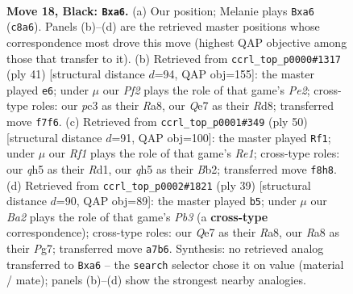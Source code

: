 \documentclass[11pt]{article}
\begin{document}
\clearpage

\begin{figure}[p]\centering
\begin{subfigure}{0.46\textwidth}\centering
\resizebox{\linewidth}{!}{%
\newchessgame
\chessboard[
  setfen={r1b2r2/b1p1qp1k/P1p4p/4p1pQ/4P1P1/2PP4/5P2/RNB2RK1 b - - 0 18},
  showmover=false,
  pgfstyle=straightmove, color=movearrow, markmove={c8-a6}
]}
\caption{}
\end{subfigure}\hfill
\begin{subfigure}{0.46\textwidth}\centering
\resizebox{\linewidth}{!}{%
\newchessgame
\chessboard[
  setfen={r2r2k1/2q1pp2/2p3p1/p1P3Qp/4B3/6Pb/PP3P1P/R3R1K1 b - - 1 21},
  showmover=false,
  pgfstyle=straightmove, color=movearrow, markmove={e7-e6}
]}
\caption{}
\end{subfigure}
\\[4pt]
\begin{subfigure}{0.46\textwidth}\centering
\resizebox{\linewidth}{!}{%
\newchessgame
\chessboard[
  setfen={2rr2k1/pb3pp1/1p5p/1P2q3/P2pP3/1Q3P2/1B4PP/3RR1K1 w - - 1 26},
  showmover=false,
  pgfstyle=straightmove, color=movearrow, markmove={e1-f1}
]}
\caption{}
\end{subfigure}\hfill
\begin{subfigure}{0.46\textwidth}\centering
\resizebox{\linewidth}{!}{%
\newchessgame
\chessboard[
  setfen={r4r1k/6p1/1pp4p/p2bqp2/Q7/P3P3/1P1R1PPP/1BR3K1 b - - 1 20},
  showmover=false,
  pgfstyle=straightmove, color=movearrow, markmove={b6-b5}
]}
\caption{}
\end{subfigure}
\caption{\textbf{Move 18, Black: \texttt{Bxa6}.} (a) Our position; Melanie plays \texttt{Bxa6} (\texttt{c8a6}). Panels (b)--(d) are the retrieved master positions whose correspondence most drove this move (highest QAP objective among those that transfer to it). (b) Retrieved from \texttt{ccrl\_top\_p0000\#1317} (ply 41) [structural distance $d$=94, QAP obj=155]: the master played \texttt{e6}; under $\mu$ our \emph{Pf2} plays the role of that game's \emph{Pe2}; cross-type roles: our \emph{p}c3 as their \emph{R}a8, our \emph{Q}e7 as their \emph{R}d8; transferred move \texttt{f7f6}. (c) Retrieved from \texttt{ccrl\_top\_p0001\#349} (ply 50) [structural distance $d$=91, QAP obj=100]: the master played \texttt{Rf1}; under $\mu$ our \emph{Rf1} plays the role of that game's \emph{Re1}; cross-type roles: our \emph{q}h5 as their \emph{R}d1, our \emph{q}h5 as their \emph{B}b2; transferred move \texttt{f8h8}. (d) Retrieved from \texttt{ccrl\_top\_p0002\#1821} (ply 39) [structural distance $d$=90, QAP obj=89]: the master played \texttt{b5}; under $\mu$ our \emph{Ba2} plays the role of that game's \emph{Pb3} (a \textbf{cross-type} correspondence); cross-type roles: our \emph{Q}e7 as their \emph{R}a8, our \emph{R}a8 as their \emph{P}g7; transferred move \texttt{a7b6}. Synthesis: no retrieved analog transferred to \texttt{Bxa6} -- the \texttt{search} selector chose it on value (material / mate); panels (b)--(d) show the strongest nearby analogies.}
\label{fig:thought-m35}
\end{figure}
\end{document}
